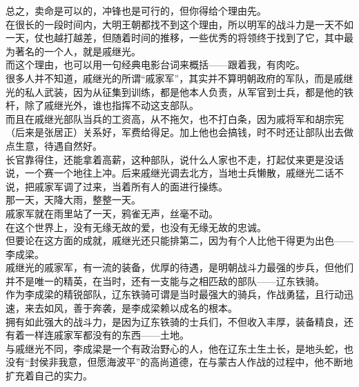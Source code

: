 \begin{multicols}{\theparacolNo}
总之，卖命是可以的，冲锋也是可行的，但你得给个理由先。\\

在很长的一段时间内，大明王朝都找不到这个理由，所以明军的战斗力是一天不如一天，仗也越打越差，但随着时间的推移，一些优秀的将领终于找到了它，其中最为著名的一个人，就是戚继光。\\

而这个理由，也可以用一句经典电影台词来概括——跟着我，有肉吃。\\

很多人并不知道，戚继光的所谓“戚家军”，其实并不算明朝政府的军队，而是戚继光的私人武装，因为从征集到训练，都是他本人负责，从军官到士兵，都是他的铁杆，除了戚继光外，谁也指挥不动这支部队。\\

而且在戚继光部队当兵的工资高，从不拖欠，也不打白条，因为戚将军和胡宗宪（后来是张居正）关系好，军费给得足。加上他也会搞钱，时不时还让部队出去做点生意，待遇自然好。\\

长官靠得住，还能拿着高薪，这种部队，说什么人家也不走，打起仗来更是没话说，一个赛一个地往上冲。后来戚继光调去北方，当地士兵懒散，戚继光二话不说，把戚家军调了过来，当着所有人的面进行操练。\\

那一天，天降大雨，整整一天。\\

戚家军就在雨里站了一天，鸦雀无声，丝毫不动。\\

在这个世界上，没有无缘无故的爱，也没有无缘无故的忠诚。\\

但要论在这方面的成就，戚继光还只能排第二，因为有个人比他干得更为出色——李成梁。\\

戚继光的戚家军，有一流的装备，优厚的待遇，是明朝战斗力最强的步兵，但他们并不是唯一的精英，在当时，还有一支能与之相匹敌的部队——辽东铁骑。\\

作为李成梁的精锐部队，辽东铁骑可谓是当时最强大的骑兵，作战勇猛，且行动迅速，来去如风，善于奔袭，是李成梁赖以成名的根本。\\

拥有如此强大的战斗力，是因为辽东铁骑的士兵们，不但收入丰厚，装备精良，还有着一样连戚家军都没有的东西——土地。\\

与戚继光不同，李成梁是一个有政治野心的人，他在辽东土生土长，是地头蛇，也没有“封侯非我意，但愿海波平”的高尚道德，在与蒙古人作战的过程中，他不断地扩充着自己的实力。\\


\end{multicols}
